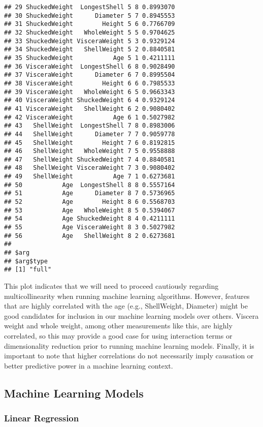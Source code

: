 \documentclass[
]{article}
\begin{document}
\begin{verbatim}
## 29 ShuckedWeight  LongestShell 5 8 0.8993070
## 30 ShuckedWeight      Diameter 5 7 0.8945553
## 31 ShuckedWeight        Height 5 6 0.7766709
## 32 ShuckedWeight   WholeWeight 5 5 0.9704625
## 33 ShuckedWeight VisceraWeight 5 3 0.9329124
## 34 ShuckedWeight   ShellWeight 5 2 0.8840581
## 35 ShuckedWeight           Age 5 1 0.4211111
## 36 VisceraWeight  LongestShell 6 8 0.9028490
## 37 VisceraWeight      Diameter 6 7 0.8995504
## 38 VisceraWeight        Height 6 6 0.7985533
## 39 VisceraWeight   WholeWeight 6 5 0.9663343
## 40 VisceraWeight ShuckedWeight 6 4 0.9329124
## 41 VisceraWeight   ShellWeight 6 2 0.9080402
## 42 VisceraWeight           Age 6 1 0.5027982
## 43   ShellWeight  LongestShell 7 8 0.8983006
## 44   ShellWeight      Diameter 7 7 0.9059778
## 45   ShellWeight        Height 7 6 0.8192815
## 46   ShellWeight   WholeWeight 7 5 0.9558888
## 47   ShellWeight ShuckedWeight 7 4 0.8840581
## 48   ShellWeight VisceraWeight 7 3 0.9080402
## 49   ShellWeight           Age 7 1 0.6273681
## 50           Age  LongestShell 8 8 0.5557164
## 51           Age      Diameter 8 7 0.5736965
## 52           Age        Height 8 6 0.5568703
## 53           Age   WholeWeight 8 5 0.5394067
## 54           Age ShuckedWeight 8 4 0.4211111
## 55           Age VisceraWeight 8 3 0.5027982
## 56           Age   ShellWeight 8 2 0.6273681
## 
## $arg
## $arg$type
## [1] "full"
\end{verbatim}

This plot indicates that we will need to proceed cautiously regarding
multicollinearity when running machine learning algorithms. However,
features that are highly correlated with the age (e.g., ShellWeight,
Diameter) might be good candidates for inclusion in our machine learning
models over others. Viscera weight and whole weight, among other
measurements like this, are highly correlated, so this may provide a
good case for using interaction terms or dimensionality reduction prior
to running machine learning models. Finally, it is important to note
that higher correlations do not necessarily imply causation or better
predictive power in a machine learning context.

\hypertarget{machine-learning-models}{%
\subsection{Machine Learning Models}\label{machine-learning-models}}

\hypertarget{linear-regression}{%
\subsubsection{Linear Regression}\label{linear-regression}}
\end{document}
